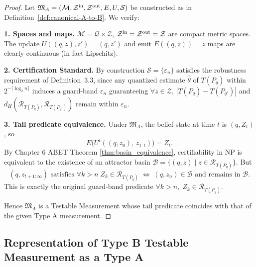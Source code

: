 \documentclass[12pt]{article}
\theoremstyle{definition}
\theoremstyle{plain}
\begin{document}
\begin{proof}
Let \(\mathfrak M_A=(\mathcal M,\mathcal Z^{\rm in},\mathcal Z^{\rm out},E,U,\mathcal S)\)
be constructed as in Definition \ref{def:canonical-A-to-B}.  We verify:

\medskip\noindent\textbf{1. Spaces and maps.}
\(\mathcal M=\mathcal Q\times\mathcal Z\), \(\mathcal Z^{\rm in}=\mathcal Z^{\rm out}=\mathcal Z\)
are compact metric spaces.  The update 
\(
U((q,z),z')=(q,z')
\)
and emit
\(
E((q,z))=z
\)
maps are clearly continuous (in fact Lipschitz).

\medskip\noindent\textbf{2. Certification Standard.}
By construction \(\mathcal S=\{\varepsilon_n\}\) satisfies
the robustness requirement of Definition 3.3, since any quantized estimate
\(\widehat\theta\) of \(T(P_q)\) within \(2^{-\lceil\log_2 n\rceil}\)
induces a guard‑band \(\varepsilon_n\) guaranteeing
\(\forall z\in\mathcal Z\), \(|T(P_q)-T(P_{q'})|\) and
\(d_H(\mathcal R_{T(P_q)},\mathcal R_{T(P_{q'})})\)
remain within \(\varepsilon_n\).

\medskip\noindent\textbf{3. Tail predicate equivalence.}
Under \(\mathfrak M_A\), the belief‑state at time \(t\) is \((q,Z_t)\), so
\[
  E\bigl(U^t((q,z_0),\,z_{1:t})\bigr)=Z_t.
\]
By Chapter 6 ABET Theorem \ref{thm:basin_equivalence}, certifiability in NP is equivalent to
the existence of an attractor basin 
\(\mathcal B=\{(q,z)\!\mid\!z\in\mathcal R_{T(P_q)}\}\).
But
\[
  (q,z_{t+1:\infty})\text{ satisfies }\forall k>n\;Z_k\in\mathcal R_{T(P_q)}
  \;\Longleftrightarrow\;
  (q,z_n)\in\mathcal B\text{ and remains in }\mathcal B.
\]
This is exactly the original guard‑band predicate
\(\forall k>n,\;Z_k\in\mathcal R_{T(P_q)}\).  

Hence \(\mathfrak M_A\) is a Testable Measurement whose tail predicate
coincides with that of the given Type A measurement.
\end{proof}

\subsection{Representation of Type B Testable Measurement as a Type A}
\end{document}
